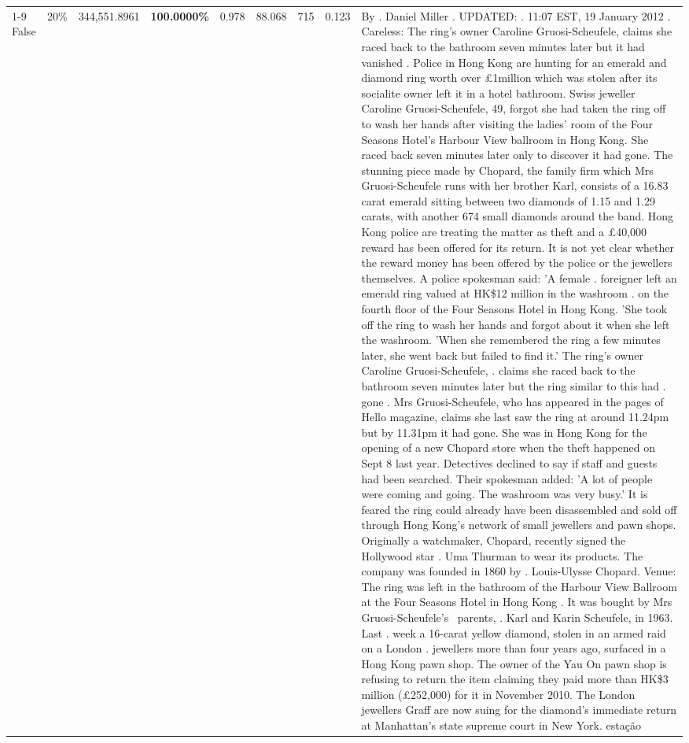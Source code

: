 \begin{table}[H]
\begin{tabular}{lllrlllll}
\cline{1-9} \cline{2-9}
False & 20\% & 344,551.8961 & \bfseries \color{red} 100.0000\% & 0.978 & 88.068 & 715 & 0.123 & By . Daniel Miller . UPDATED: . 11:07 EST, 19 January 2012 . Careless: The ring's owner Caroline Gruosi-Scheufele, claims she raced back to the bathroom seven minutes later but it had vanished . Police in Hong Kong are hunting for an emerald and diamond ring worth over £1million which was stolen after its socialite owner left it in a hotel bathroom. Swiss jeweller Caroline Gruosi-Scheufele, 49, forgot she had taken the ring off to wash her hands after visiting the ladies' room of the Four Seasons Hotel's Harbour View ballroom in Hong Kong. She raced back seven minutes later only to discover it had gone. The stunning piece made by Chopard, the family firm which Mrs Gruosi-Scheufele runs with her brother Karl, consists of a 16.83 carat emerald sitting between two diamonds of 1.15 and 1.29 carats, with another 674 small diamonds around the band. Hong Kong police are treating the matter as theft and a £40,000 reward has been offered for its return. It is not yet clear whether the reward money has been offered by the police or the jewellers themselves. A police spokesman said: 'A female . foreigner left an emerald ring valued at HK\$12 million in the washroom . on the fourth floor of the Four Seasons Hotel in Hong Kong. 'She took off the ring to wash her hands and forgot about it when she left the washroom. 'When she remembered the ring a few minutes later, she went back but failed to find it.' The ring's owner Caroline Gruosi-Scheufele, . claims she raced back to the bathroom seven minutes later but the ring similar to this had . gone . Mrs Gruosi-Scheufele, who has appeared in the pages of Hello magazine, claims she last saw the ring at around 11.24pm but by 11.31pm it had gone. She was in Hong Kong for the opening of a new Chopard store when the theft happened on Sept 8 last year. Detectives declined to say if staff and guests had been searched. Their spokesman added: 'A lot of people were coming and going. The washroom was very busy.' It is feared the ring could already have been disassembled and sold off through Hong Kong's network of small jewellers and pawn shops. Originally a watchmaker, Chopard, recently signed the Hollywood star . Uma Thurman to wear its products. The company was founded in 1860 by . Louis-Ulysse Chopard. Venue: The ring was left in the bathroom of the Harbour View Ballroom at the Four Seasons Hotel in Hong Kong . It was bought by Mrs Gruosi-Scheufele's  parents, . Karl and Karin Scheufele, in 1963. Last . week a 16-carat yellow diamond, stolen in an armed raid on a London . jewellers more than four years ago, surfaced in a Hong Kong pawn shop. The owner of the Yau On pawn shop is refusing to return the item claiming they paid more than HK\$3 million (£252,000) for it in November 2010. The London jewellers Graff are now suing for the diamond’s immediate return at Manhattan’s state supreme court in New York. estação \\

\end{tabular}
\end{table}
